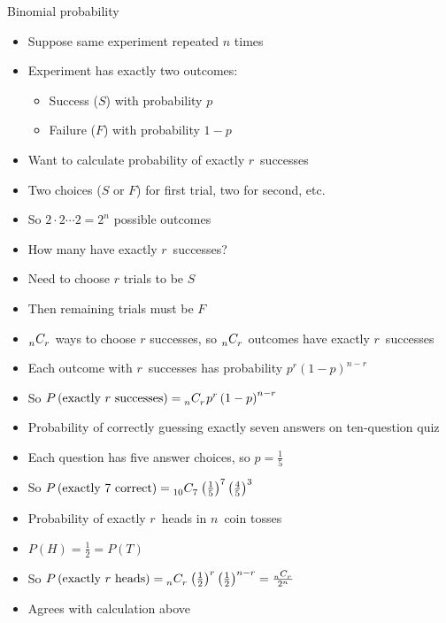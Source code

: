 \documentclass[handout,xcolor=dvipsnames]{beamer}
\theoremstyle{definition}
\newcommand\ncr[2]{\tensor[_{#1}]C{_{#2}}}
\begin{document}
\begin{frame}{Binomial probability}
\begin{itemize}
\item Suppose same experiment repeated $n$ times
\item Experiment has exactly two outcomes:
\begin{itemize}
\item Success ($S$) with probability $p$
\item Failure ($F$) with probability $1-p$
\end{itemize}
\item Want to calculate probability of exactly $r$~successes
\item Two choices ($S$ or $F$) for first trial, two for second, etc.
\item So $2\cdot 2\cdots 2=2^n$ possible outcomes
\item How many have exactly $r$~successes?
\item Need to choose $r$ trials to be $S$
\item Then remaining trials must be $F$
\item $\ncr{n}{r}$ ways to choose $r$ successes,
so $\ncr{n}{r}$ outcomes have exactly $r$~successes
\item Each outcome with $r$~successes has probability
$p^r\left(1-p\right)^{n-r}$
\item So $P\left(\text{exactly $r$ successes}\right)
=\ncr{n}{r}p^r\left(1-p\right)^{n-r}$
\end{itemize}
\end{frame}

\begin{frame}
\begin{example}
\begin{itemize}
\item Probability of correctly guessing exactly seven answers
on ten-question quiz
\item Each question has five answer choices,
so $p=\frac{1}{5}$
\item So $P\left(\text{exactly $7$ correct}\right)
=\ncr{10}{7}\left(\frac{1}{5}\right)^7\left(\frac{4}{5}\right)^3$
\end{itemize}
\end{example}
\begin{example}
\begin{itemize}
\item Probability of exactly $r$~heads in $n$~coin tosses
\item $P\left(H\right)=\frac{1}{2}=P\left(T\right)$
\item So $P\left(\text{exactly $r$ heads}\right)
=\ncr{n}{r}\left(\frac{1}{2}\right)^r\left(\frac{1}{2}\right)^{n-r}
=\frac{\ncr{n}{r}}{2^n}$
\item Agrees with calculation above
\end{itemize}
\end{example}
\end{frame}
\end{document}

